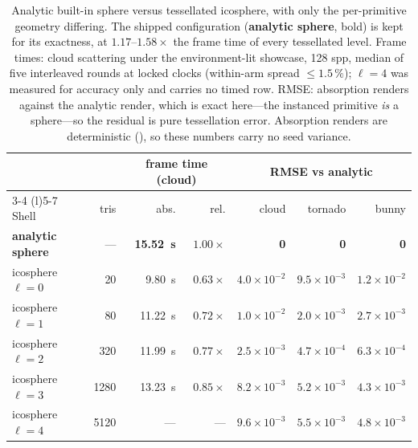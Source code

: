 \begin{table}[htp]
  \centering
  \setlength{\tabcolsep}{4pt}%
  \begin{tabular}{@{}lrrrrrr@{}}
    \toprule
    & & \multicolumn{2}{c}{frame time (cloud)} & \multicolumn{3}{c}{RMSE vs analytic} \\
    \cmidrule(lr){3-4} \cmidrule(l){5-7}
    Shell & tris & abs. & rel. & cloud & tornado & bunny \\
    \midrule
    \textbf{analytic sphere} & --- & \textbf{\SI{15.52}{\second}} & \textbf{$1.00\times$} & \textbf{0} & \textbf{0} & \textbf{0} \\
    icosphere $\ell{=}0$ & 20   & \SI{9.80}{\second}  & $0.63\times$ & $4.0\times10^{-2}$ & $9.5\times10^{-3}$ & $1.2\times10^{-2}$ \\
    icosphere $\ell{=}1$ & 80   & \SI{11.22}{\second} & $0.72\times$ & $1.0\times10^{-2}$ & $2.0\times10^{-3}$ & $2.7\times10^{-3}$ \\
    icosphere $\ell{=}2$ & 320  & \SI{11.99}{\second} & $0.77\times$ & $2.5\times10^{-3}$ & $4.7\times10^{-4}$ & $6.3\times10^{-4}$ \\
    icosphere $\ell{=}3$ & 1280 & \SI{13.23}{\second} & $0.85\times$ & $8.2\times10^{-3}$ & $5.2\times10^{-3}$ & $4.3\times10^{-3}$ \\
    icosphere $\ell{=}4$ & 5120 & ---                 & ---          & $9.6\times10^{-3}$ & $5.5\times10^{-3}$ & $4.8\times10^{-3}$ \\
    \bottomrule
  \end{tabular}
  \caption{Analytic built-in sphere versus tessellated icosphere, with only the per-primitive geometry
  differing. The shipped configuration (\textbf{analytic sphere}, bold) is kept for its exactness, at
$1.17$--$1.58\times$ the frame time of every tessellated level. Frame times: cloud
  scattering under the environment-lit showcase, \num{128} spp, median of five interleaved rounds at
  locked clocks (within-arm spread ${\le}1.5\,\%$); $\ell{=}4$ was measured for accuracy only and carries no timed row. RMSE: absorption renders against the
  analytic render, which is exact here---the instanced primitive \emph{is} a sphere---so the residual is
  pure tessellation error. Absorption renders are deterministic (), so these numbers
  carry no seed variance.}
  \label{tab:icosphere}
\end{table}

